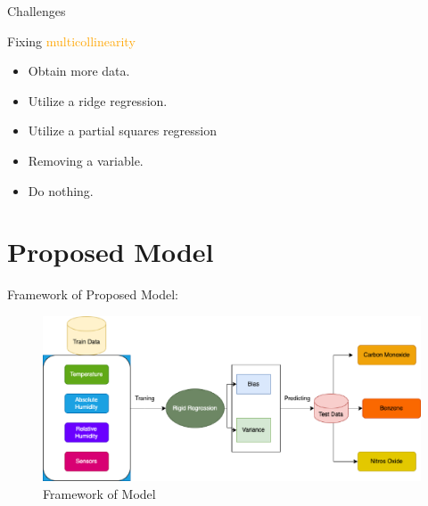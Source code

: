 \documentclass[
 size=14pt,
 paper=smartboard,  %
 mode=present, 		%
 display=slides, 	%
 style=tuliplab,  	%
 pauseslide,
 fleqn,leqno]{powerdot}
\begin{document}
\begin{slide}{Challenges}

Fixing \textcolor{orange}{multicollinearity}

\begin{itemize}
\item
Obtain more data.
\item
Utilize a ridge regression.
\item Utilize a partial squares regression
\item Removing a variable.
\item Do nothing.
\end{itemize}



\end{slide}



\section{Proposed Model}


\begin{slide}[toc=,bm=]{}

Framework of Proposed Model:


\begin{figure}
  \centering
 \includegraphics[width=1.0\linewidth,height=.4\linewidth]{graphics//Air Prediction.eps}
  \caption{Framework of Model} \label{framework}
\end{figure}

\end{slide}
\end{document}
